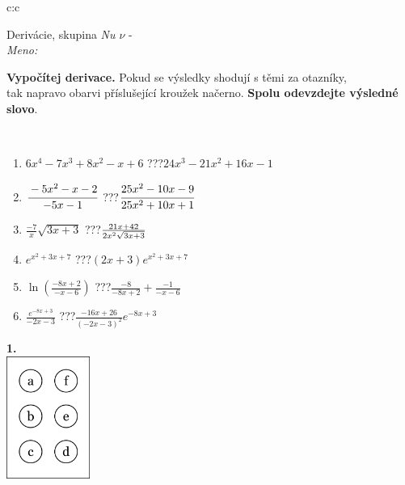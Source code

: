 \documentclass[10pt]{report}
\begin{document}
\begin{tabular}{c:c}
\begin{minipage}[c][104.5mm][t]{0.5\linewidth}
\begin{center}
\vspace{7mm}
{\huge Derivácie, skupina \textit{Nu $\nu$} -}\\[5mm]
\textit{Meno:}\phantom{xxxxxxxxxxxxxxxxxxxxxxxxxxxxxxxxxxxxxxxxxxxxxxxxxxxxxxxxxxxxxxxxx}\\[5mm]
\begin{minipage}{0.95\linewidth}
\begin{center}
\textbf{Vypočítej derivace.} Pokud se výsledky shodují s těmi za otazníky,\\tak napravo obarvi příslušející kroužek načerno. \textbf{Spolu odevzdejte výsledné slovo}.
\end{center}
\end{minipage}
\\[1mm]
\begin{minipage}{0.79\linewidth}
\begin{center}
\begin{varwidth}{\linewidth}
\begin{enumerate}
\normalsize
\item $6x^4-7x^3+8x^2-x+6$\quad \dotfill\; ???\;\dotfill \quad $24x^3-21x^2+16x-1$
\item $\cfrac{-5x^2-x-2}{-5x-1}$\quad \dotfill\; ???\;\dotfill \quad $\cfrac{25x^2-10x-9}{25x^2+10x+1}$
\item $\frac{-7}{x}\sqrt{3x+3}$\quad \dotfill\; ???\;\dotfill \quad $\frac{21x+42}{2x^2 \sqrt{\smash[b]{3x+3}}}$
\item $e^{x^2+3x+7}$\quad \dotfill\; ???\;\dotfill \quad $(2x+3)e^{x^2+3x+7}$
\item $\ln{\left(\frac{-8x+2}{-x-6}\right)}$\quad \dotfill\; ???\;\dotfill \quad $\frac{-8}{-8x+2}+\frac{-1}{-x-6}$
\item $\frac{e^{-8x+3}}{-2x-3}$\quad \dotfill\; ???\;\dotfill \quad $\frac{-16x+26}{(-2x-3)^2}e^{-8x+3}$
\end{enumerate}
\end{varwidth}
\end{center}
\end{minipage}
\begin{minipage}{0.20\linewidth}
\begin{center}
{\Huge\bfseries 1.} \\[2mm]
\includegraphics[height=40mm]{../images/braille.png}

\end{center}
\end{minipage}
\end{center}
\end{minipage}
\end{tabular}
\end{document}
